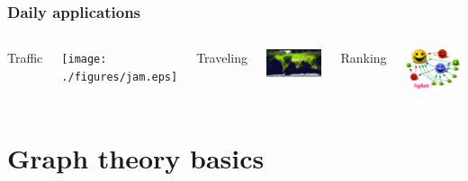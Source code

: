 \documentclass[article]{beamer}
\begin{document}
\begin{frame}
	\frametitle{Daily applications}
	\begin{columns}
		Traffic
		\begin{center}
			\texttt{[image: ./figures/jam.eps]}
		\end{center}
		Traveling
		\begin{center}
			\includegraphics[scale=0.05]{./figures/airlines.png}
		\end{center}
		Ranking
		\begin{center}
			\includegraphics[scale=0.022]{./figures/pagerank.png}
		\end{center}
	\end{columns}
\end{frame}

\section{Graph theory basics}
\end{document}
